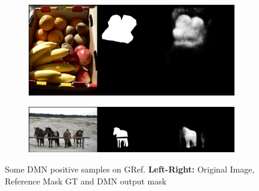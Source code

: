 \begin{figure}[!htbp]
    \ContinuedFloat
	\centering
    
    \begin{subfigure}[b]{\columnwidth}
            \centering
            \includegraphics[width=\textwidth]{./figures/gref_samples/4.png}
    \end{subfigure}
    \begin{subfigure}[b]{\columnwidth}
            \centering
            \includegraphics[width=\textwidth]{./figures/gref_samples/6.png}
    \end{subfigure}
    
    \caption{Some DMN positive samples on GRef. \textbf{Left-Right:} Original Image, Reference Mask GT and DMN output mask}
    \label{Fig:GRef_Pos}
\end{figure}

